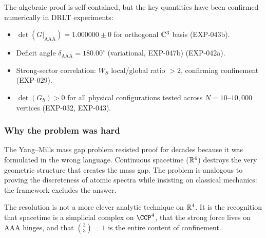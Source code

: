 The algebraic proof is self-contained, but the key quantities have been
confirmed numerically in DRLT experiments:

\begin{itemize}
\item $\det(G|_{\mathrm{AAA}}) = 1.000000 \pm 0$ for orthogonal
  $\mathbb{C}^3$ basis (EXP-043b).
\item Deficit angle $\delta_{\mathrm{AAA}} = 180.00^\circ$ (variational, EXP-047b)
  (EXP-042a).
\item Strong-sector correlation: $W_S$ local/global ratio $> 2$,
  confirming confinement (EXP-029).
\item $\det(G_h) > 0$ for all physical configurations tested across
  $N = 10$--$10{,}000$ vertices (EXP-032, EXP-043).
\end{itemize}

\subsubsection{Why the problem was hard}

The Yang--Mills mass gap problem resisted proof for decades because it
was formulated in the wrong language. Continuous spacetime
($\mathbb{R}^4$) destroys the very geometric structure that creates the
mass gap. The problem is analogous to proving the discreteness of atomic
spectra while insisting on classical mechanics: the framework excludes
the answer.

The resolution is not a more clever analytic technique on $\mathbb{R}^4$.
It is the recognition that spacetime is a simplicial complex on
$\CCP^4$, that the strong force lives on AAA hinges, and that
$\binom{3}{3} = 1$ is the entire content of confinement.

